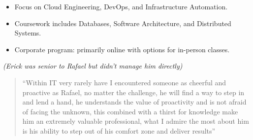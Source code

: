 \documentclass[10pt,a4paper,withhyper]{altacv}
\begin{document}
\divider\smallskip

\begin{itemize}
  \item Focus on Cloud Engineering, DevOps, and Infrastructure Automation.
  \item Coursework includes Databases, Software Architecture, and Distributed Systems.
  \item Corporate program: primarily online with options for in-person classes.
\end{itemize}

\divider



\vspace{0.5em}

\textit{\footnotesize (Erick was senior to Rafael but didn’t manage him directly)}

\vspace{1em}

\begin{quote}
\color{black}
``Within IT very rarely have I encountered someone as cheerful and proactive as Rafael, no matter the challenge, he will find a way to step in and lend a hand, he understands the value of proactivity and is not afraid of facing the unknown, this combined with a thirst for knowledge make him an extremely valuable professional, what I admire the most about him is his ability to step out of his comfort zone and deliver results''
\end{quote}

\vspace{1em}

\begin{center}
\end{center}
\end{document}
